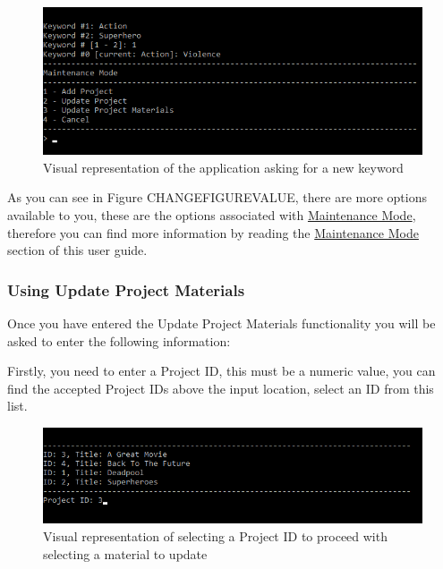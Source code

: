 \documentclass[
  english,
  a4paper,
,tablecaptionabove
]{scrartcl}
\begin{document}
\begin{figure}
\centering
\includegraphics{images/user-guide/maintenance-mode/update-project-keyword.png}
\caption{Visual representation of the application asking for a new
keyword}
\end{figure}

As you can see in Figure CHANGEFIGUREVALUE, there are more options
available to you, these are the options associated with
\protect\hyperlink{using-maintenance-mode}{Maintenance Mode}, therefore
you can find more information by reading the
\protect\hyperlink{using-maintenance-mode}{Maintenance Mode} section of
this user guide.

\newpage

\hypertarget{using-update-project-materials}{%
\subsubsection{Using Update Project
Materials}\label{using-update-project-materials}}

Once you have entered the Update Project Materials functionality you
will be asked to enter the following information:

Firstly, you need to enter a Project ID, this must be a numeric value,
you can find the accepted Project IDs above the input location, select
an ID from this list.

\begin{figure}
\centering
\includegraphics{images/user-guide/maintenance-mode/update-project-select-id.png}
\caption{Visual representation of selecting a Project ID to proceed with
selecting a material to update}
\end{figure}
\end{document}
